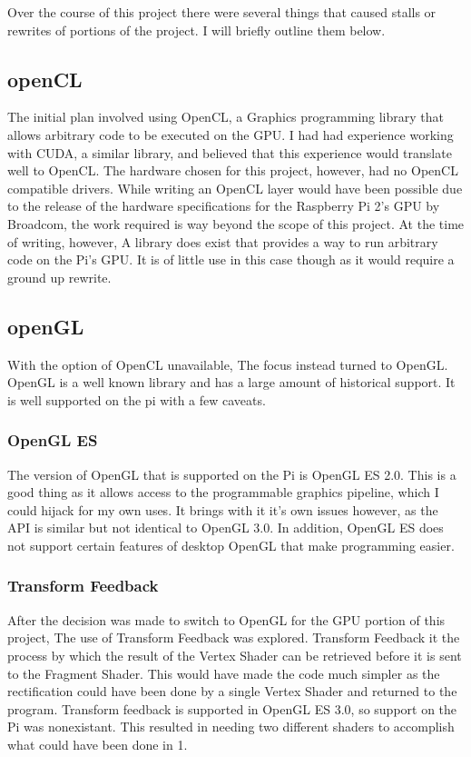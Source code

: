 Over the course of this project there were several things that caused stalls or rewrites of portions of the project.  I will briefly outline them below.

\subsection{openCL}
The initial plan involved using OpenCL, a Graphics programming library that allows arbitrary code to be executed on the GPU.  I had had experience working with CUDA, a similar library, and believed that this experience would translate well to OpenCL.  The hardware chosen for this project, however, had no OpenCL compatible drivers.  While writing an OpenCL layer would have been possible due to the release of the hardware specifications for the Raspberry Pi 2's GPU by Broadcom, the work required is way beyond the scope of this project.  At the time of writing, however, A library does exist that provides a way to run arbitrary code on the Pi's GPU.  It is of little use in this case though as it would require a ground up rewrite.

\subsection{openGL}
With the option of OpenCL unavailable, The focus instead turned to OpenGL.  OpenGL is a well known library and has a large amount of historical support.  It is well supported on the pi with a few caveats.
\subsubsection{OpenGL ES}
The version of OpenGL that is supported on the Pi is OpenGL ES 2.0.  This is a good thing as it allows access to the programmable graphics pipeline, which I could hijack for my own uses.  It brings with it it's own issues however, as the API is similar but not identical to OpenGL 3.0.  In addition, OpenGL ES does not support certain features of desktop OpenGL that make programming easier.
\subsubsection{Transform Feedback}
After the decision was made to switch to OpenGL for the GPU portion of this project, The use of Transform Feedback was explored.  Transform Feedback it the process by which the result of the Vertex Shader can be retrieved before it is sent to the Fragment Shader.  This would have made the code much simpler as the rectification could have been done by a single Vertex Shader and returned to the program.  Transform feedback is supported in OpenGL ES 3.0, so support on the Pi was nonexistant.  This resulted in needing two different shaders to accomplish what could have been done in 1.
